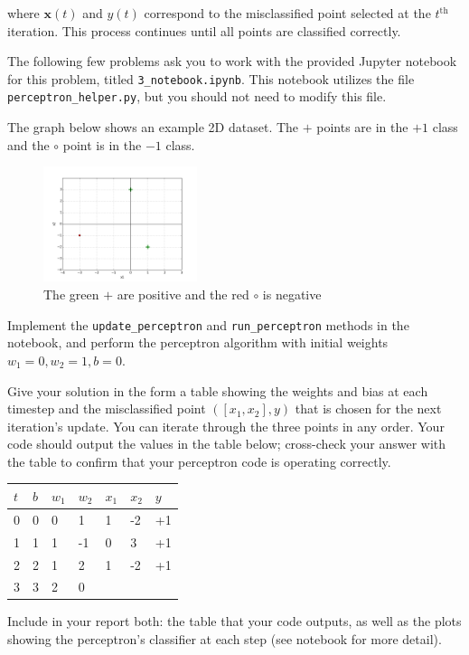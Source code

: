 where $\mathbf{x}(t)$ and $y(t)$ correspond to the misclassified point selected at the $t^\text{th}$ iteration.
This process continues until all points are classified correctly.

The following few problems ask you to work with the provided Jupyter notebook for this problem, titled \texttt{3_notebook.ipynb}. This notebook utilizes the file \texttt{perceptron_helper.py}, but you should not need to modify this file.

\begin{problem}[8]
The graph below shows an example 2D dataset.
The $+$ points are in the $+1$ class and the $\circ$ point is in the $-1$ class.

\begin{figure}[H]
	\centering
	\includegraphics[width=0.4\textwidth]{images/perceptron.png}
	\caption{The green $+$ are positive and the red $\circ$ is negative}
	\label{fig:figure1}
\end{figure}

Implement the \texttt{update_perceptron} and \texttt{run_perceptron} methods in the notebook, and perform the perceptron algorithm with initial weights $w_1 = 0, w_2 = 1, b = 0$.

Give your solution in the form a table showing the weights and bias at each timestep and the misclassified point $([x_1,x_2],y)$ that is chosen for the next iteration's update. You can iterate through the three points in any order. Your code should output the values in the table below; cross-check your answer with the table to confirm that your perceptron code is operating correctly.

\begin{table}[H]
	\centering

	\begin{tabular}{l|lll|ll|l}
		\hline

		\hline
		$t$ & $b$ & $w_1$ & $w_2$ & $x_1$ & $x_2$ & $y$ \\
		\hline
		0   & 0   & 0     & 1     & 1     & -2    & +1  \\
		1   & 1   & 1     & -1    & 0     & 3     & +1  \\
		2   & 2   & 1     & 2     & 1     & -2    & +1  \\
		3   & 3   & 2     & 0                           \\
		\hline
	\end{tabular}
\end{table}

Include in your report both: the table that your code outputs, as well as the plots showing the perceptron's classifier at each step (see notebook for more detail).


\end{problem}
